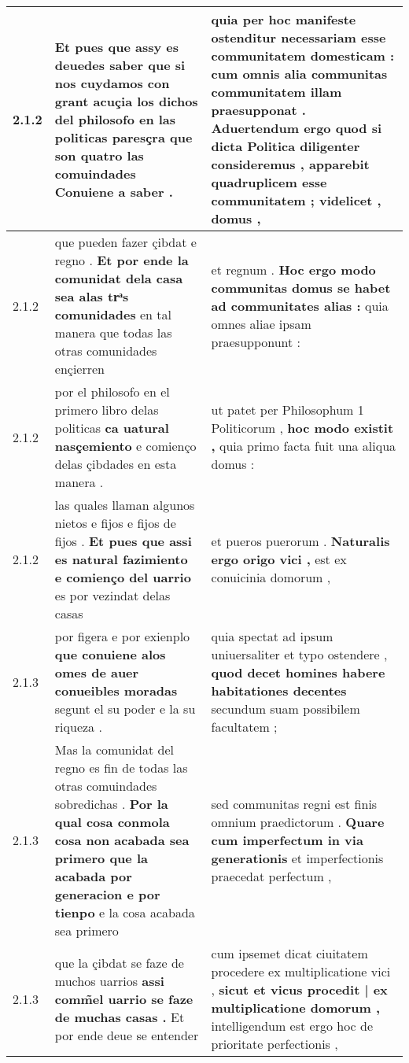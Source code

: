 \begin{tabular}{|p{1cm}|p{6.5cm}|p{6.5cm}|}
2.1.2 & Et pues que assy es deuedes saber \textbf{ que si nos cuydamos con grant acuçia los dichos del philosofo en las politicas paresçra } que son quatro las comuindades Conuiene a saber . & quia per hoc manifeste ostenditur necessariam esse communitatem domesticam : \textbf{ cum omnis alia communitas communitatem illam praesupponat . Aduertendum ergo quod si dicta Politica diligenter consideremus , } apparebit quadruplicem esse communitatem ; videlicet , domus , \\\hline
2.1.2 & que pueden fazer çibdat e regno . \textbf{ Et por ende la comunidat dela casa sea alas trͣs comunidades } en tal manera que todas las otras comunidades ençierren & et regnum . \textbf{ Hoc ergo modo communitas domus se habet ad communitates alias : } quia omnes aliae ipsam praesupponunt : \\\hline
2.1.2 & por el philosofo en el primero libro delas politicas \textbf{ ca uatural nasçemiento } e comienço delas çibdades en esta manera . & ut patet per Philosophum 1 Politicorum , \textbf{ hoc modo existit , } quia primo facta fuit una aliqua domus : \\\hline
2.1.2 & las quales llaman algunos nietos e fijos e fijos de fijos . \textbf{ Et pues que assi es natural fazimiento e comienço del uarrio } es por vezindat delas casas & et pueros puerorum . \textbf{ Naturalis ergo origo vici , } est ex conuicinia domorum , \\\hline
2.1.3 & por figera e por exienplo \textbf{ que conuiene alos omes de auer conueibles moradas } segunt el su poder e la su riqueza . & quia spectat ad ipsum uniuersaliter et typo ostendere , \textbf{ quod decet homines habere habitationes decentes } secundum suam possibilem facultatem ; \\\hline
2.1.3 & Mas la comunidat del regno es fin de todas las otras comuindades sobredichas . \textbf{ Por la qual cosa conmola cosa non acabada sea primero que la acabada por generacion e por tienpo } e la cosa acabada sea primero & sed communitas regni est finis omnium praedictorum . \textbf{ Quare cum imperfectum in via generationis } et imperfectionis praecedat perfectum , \\\hline
2.1.3 & que la çibdat se faze de muchos uarrios \textbf{ assi comm̃el uarrio se faze de muchas casas . } Et por ende deue se entender & cum ipsemet dicat ciuitatem procedere ex multiplicatione vici , \textbf{ sicut et vicus procedit | ex multiplicatione domorum , } intelligendum est ergo hoc de prioritate perfectionis , \\\hline

\end{tabular}
